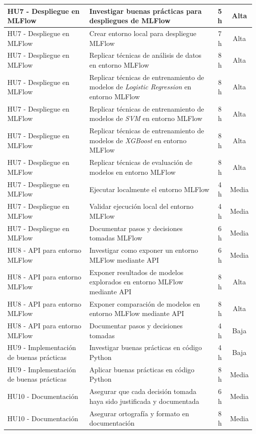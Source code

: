 \documentclass[
11pt, %
]{charter}
\begin{document}
\begin{xltabular}{\linewidth}{@{}|X|X|c|c|@{}}
HU7 - Despliegue en MLFlow & Investigar buenas prácticas para despliegues de MLFlow & 5 h & Alta \\ \hline
HU7 - Despliegue en MLFlow & Crear entorno local para despliegue MLFlow & 7 h & Alta \\ \hline
HU7 - Despliegue en MLFlow & Replicar técnicas de análisis de datos en entorno MLFlow & 8 h & Alta \\ \hline
HU7 - Despliegue en MLFlow & Replicar técnicas de entrenamiento de modelos de \textit{Logistic Regression} en entorno MLFlow & 8 h & Alta \\ \hline
HU7 - Despliegue en MLFlow & Replicar técnicas de entrenamiento de modelos de \textit{SVM} en entorno MLFlow & 8 h & Alta \\ \hline
HU7 - Despliegue en MLFlow & Replicar técnicas de entrenamiento de modelos de \textit{XGBoost} en entorno MLFlow & 8 h & Alta \\ \hline
HU7 - Despliegue en MLFlow & Replicar técnicas de evaluación de modelos en entorno MLFlow & 8 h & Alta \\ \hline
HU7 - Despliegue en MLFlow & Ejecutar localmente el entorno MLFlow & 4 h & Media \\ \hline
HU7 - Despliegue en MLFlow & Validar ejecución local del entorno MLFlow & 4 h & Media \\ \hline
HU7 - Despliegue en MLFlow & Documentar pasos y decisiones tomadas MLFlow & 6 h & Media \\ \hline
HU8 - API para entorno MLFlow & Investigar como exponer un entorno MLFlow mediante API & 6 h & Media \\ \hline
HU8 - API para entorno MLFlow & Exponer resultados de modelos explorados en entorno MLFlow mediante API & 8 h & Alta \\ \hline
HU8 - API para entorno MLFlow & Exponer comparación de modelos en entorno MLFlow mediante API & 8 h & Alta \\ \hline
HU8 - API para entorno MLFlow & Documentar pasos y decisiones tomadas & 4 h & Baja \\ \hline
HU9 - Implementación de buenas prácticas & Investigar buenas prácticas en código Python & 4 h & Baja \\ \hline
HU9 - Implementación de buenas prácticas & Aplicar buenas prácticas en código Python & 8 h & Media \\ \hline
HU10 - Documentación & Asegurar que cada decisión tomada haya sido justificada y documentada & 6 h & Media \\ \hline
HU10 - Documentación & Asegurar ortografía y formato en documentación & 8 h & Media \\ \hline

\end{xltabular}
\end{document}
